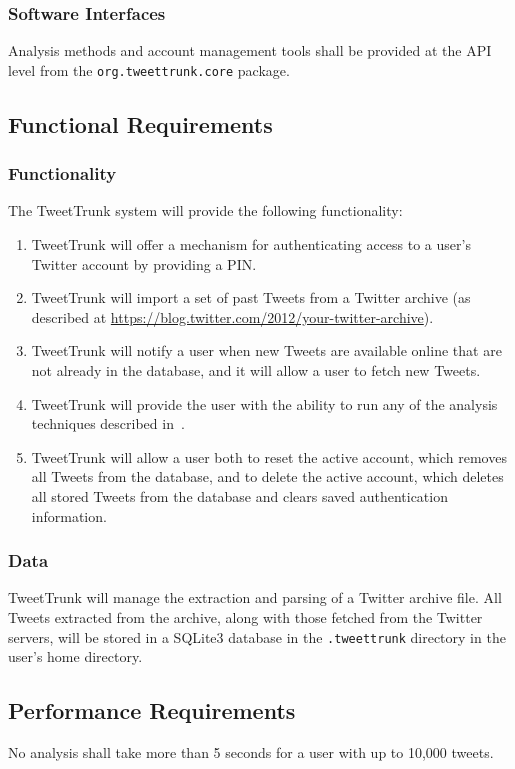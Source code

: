 \documentclass[a4paper, 12pt]{article}
\begin{document}
\subsubsection{Software Interfaces}
Analysis methods and account management tools shall be provided at the API level from the \texttt{org.tweettrunk.core} package.

\subsection{Functional Requirements}
\subsubsection{Functionality}
The TweetTrunk system will provide the following functionality:
\begin{enumerate}
\item TweetTrunk will offer a mechanism for authenticating access to a user's Twitter account by providing a PIN.
\item TweetTrunk will import a set of past Tweets from a Twitter archive (as described at \url{https://blog.twitter.com/2012/your-twitter-archive}).
\item TweetTrunk will notify a user when new Tweets are available online that are not already in the database, and it will allow a user to fetch new Tweets.
\item TweetTrunk will provide the user with the ability to run any of the analysis techniques described in~.
\item TweetTrunk will allow a user both to reset the active account, which removes all Tweets from the database, and to delete the active account, which deletes all stored Tweets from the database and clears saved authentication information.
\end{enumerate}
\subsubsection{Data}
TweetTrunk will manage the extraction and parsing of a Twitter archive file. All Tweets extracted from the archive, along with those fetched from the Twitter servers, will be stored in a SQLite3 database in the \texttt{.tweettrunk} directory in the user's home directory.

\subsection{Performance Requirements}
No analysis shall take more than 5 seconds for a user with up to 10,000 tweets.
\end{document}
